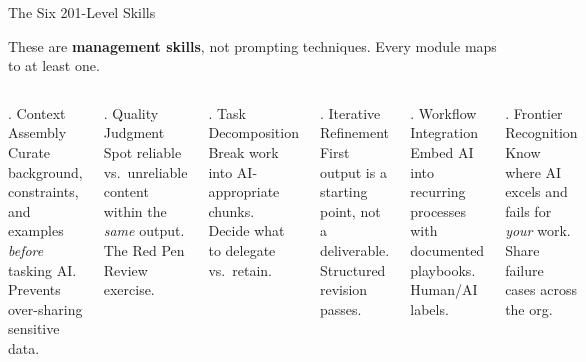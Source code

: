 \documentclass[aspectratio=169,11pt]{beamer}
\newcommand{\hl}[1]{\textbf{\color{scarlet}#1}}
\begin{document}
\begin{frame}[shrink=5]{The Six 201-Level Skills}

{\small These are \hl{management skills}, not prompting techniques. Every module maps to at least one.}

\vspace{3pt}

\begin{columns}[T]

\begin{block}{\faSearch{}. Context Assembly}
{\scriptsize Curate background, constraints, and examples \emph{before} tasking AI. Prevents over-sharing sensitive data.}
\end{block}

\begin{block}{\faCheckCircle{}. Quality Judgment}
{\scriptsize Spot reliable vs.\ unreliable content within the \emph{same} output. The Red Pen Review exercise.}
\end{block}

\begin{block}{\faProjectDiagram{}. Task Decomposition}
{\scriptsize Break work into AI-appropriate chunks. Decide what to delegate vs.\ retain.}
\end{block}


\begin{block}{\faSync*{}. Iterative Refinement}
{\scriptsize First output is a starting point, not a deliverable. Structured revision passes.}
\end{block}

\begin{block}{\faCogs{}. Workflow Integration}
{\scriptsize Embed AI into recurring processes with documented playbooks. Human/AI labels.}
\end{block}

\begin{block}{\faGlobe{}. Frontier Recognition}
{\scriptsize Know where AI excels and fails for \emph{your} work. Share failure cases across the org.}
\end{block}

\end{columns}

\end{frame}
\end{document}
